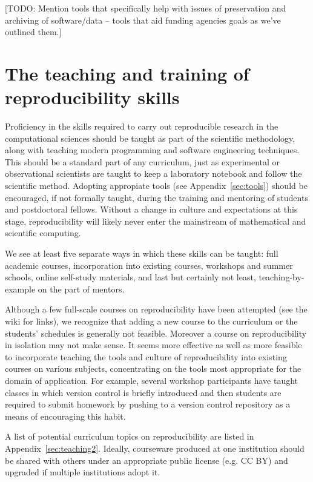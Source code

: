 \documentclass[11pt]{article}
\newcommand{\todo}[1]{{\color{red} [TODO: #1]}}
\newcommand{\todo}[1]{}
\begin{document}
\todo{ Mention tools that specifically help with issues of preservation and
archiving of software/data – tools that aid funding agencies goals as we’ve
outlined them.}

\section{The teaching and training of reproducibility skills}
\label{sec:teaching}

Proficiency in the skills required to carry out
reproducible research in the computational sciences should be taught as part
of the scientific methodology, along with teaching modern programming and
software engineering techniques. This should be a standard part of any
curriculum, just as experimental or observational scientists are taught
to keep a laboratory notebook and follow the scientific method.  
Adopting appropiate tools (see Appendix~\ref{sec:tools}) should be
encouraged, if not formally taught, during the training and mentoring of
students and postdoctoral fellows. Without a change in culture and
expectations at this stage, reproducibility will likely never enter the
mainstream of mathematical and scientific computing.

We see at least five separate ways in which these skills can be
taught: full academic courses, incorporation into existing
courses, workshops and summer schools, online self-study materials, and last
but certainly not least, teaching-by-example on the part of mentors. 

Although a few full-scale courses on reproducibility have been attempted
(see the wiki for links), we
recognize that adding a new course to the curriculum or the students'
schedules is generally not feasible.  Moreover a course on reproducibility
in isolation may not make sense.  It seems more effective as well as more
feasible to incorporate teaching the tools and culture of reproducibility
into existing courses on various subjects, concentrating on the tools most
appropriate for the domain of application.  For example, several workshop
participants have taught classes in which version control is briefly
introduced and then students are required to submit homework by pushing to a
version control repository as a means of encouraging this habit.

A list of potential curriculum topics on reproducibility are listed in 
Appendix~\ref{sec:teaching2}.
Ideally, courseware produced at one institution should be shared with others
under an appropriate public license (e.g. CC BY) and upgraded if multiple
institutions adopt it. 
\end{document}
